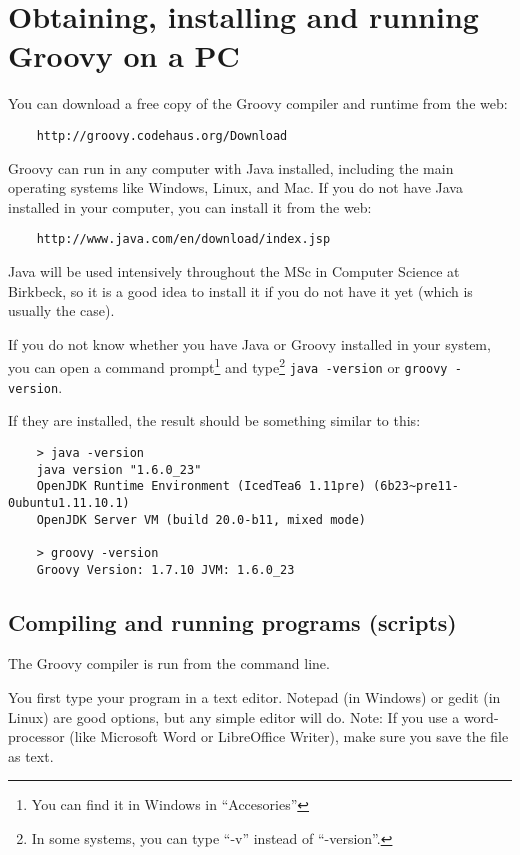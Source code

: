 \section{Obtaining, installing and running Groovy on a PC}
\label{sec:obta-inst-runn}
 
You can download a free copy of the Groovy compiler and runtime from the web:

\begin{verbatim}
    http://groovy.codehaus.org/Download
\end{verbatim}

Groovy can run in any computer with Java installed, including the main
operating systems like Windows, Linux, and Mac. If you do not have
Java installed in your computer, you can install it from the web:

\begin{verbatim}
    http://www.java.com/en/download/index.jsp
\end{verbatim}

Java will be used intensively throughout the MSc in Computer Science
at Birkbeck, so it is a good idea to install it if you do not have it
yet (which is usually the case).

If you do not know whether you have Java or Groovy installed in your
system, you can open a command prompt\footnote{You can find it in Windows in
  ``Accesories''} and type\footnote{In some systems, you can type
  ``-v'' instead of ``-version''.} \verb+java -version+ 
or \verb+groovy -version+. 

If they are installed, the result should be something similar to this:

\begin{verbatim}
    > java -version
    java version "1.6.0_23"
    OpenJDK Runtime Environment (IcedTea6 1.11pre) (6b23~pre11-0ubuntu1.11.10.1)
    OpenJDK Server VM (build 20.0-b11, mixed mode)

    > groovy -version
    Groovy Version: 1.7.10 JVM: 1.6.0_23
\end{verbatim}



\subsection*{Compiling and running programs (scripts)}

The Groovy compiler is run from the command line.

You first type your program in a text editor. Notepad (in Windows) or
gedit (in Linux) are good options, but any simple editor will
do. Note: If you use a word-processor (like Microsoft Word or
LibreOffice Writer), make sure you save the file as text.

